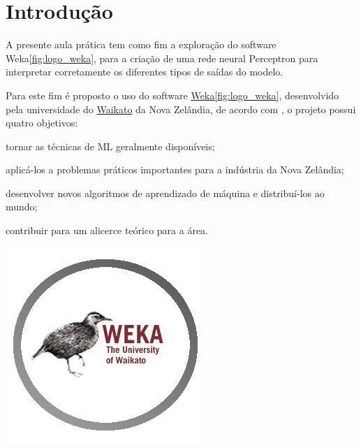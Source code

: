 
\section{Introdução}

\noindent \begin{minipage}[c]{0.6\textwidth}
  \vspace {1cm}
  \par A presente aula prática tem como fim a exploração do software Weka\ref{fig:logo_weka}, para a criação de uma rede neural Perceptron para interpretar corretamente os diferentes tipos de saídas do modelo.
  \par Para este fim é proposto o uso do software \href{https://www.cs.waikato.ac.nz/ml/index.html}{Weka}\ref{fig:logo_weka}, desenvolvido pela universidade do \href{https://www.waikato.ac.nz/}{Waikato} da Nova Zelândia, de acordo com , o projeto possui quatro objetivos:
  \begin{asparaenum}
    \item tornar as técnicas de ML geralmente disponíveis;
    \item aplicá-los a problemas práticos importantes para a indústria da Nova Zelândia;
    \item desenvolver novos algoritmos de aprendizado de máquina e distribuí-los ao mundo;
    \item contribuir para um alicerce teórico para a área.
  \end{asparaenum}

\end{minipage}
\begin{minipage}[c]{0.4\textwidth}

  \includegraphics[width=\textwidth]{figure/weka-logo.jpg}
  	\label{fig:logo_weka}
\end{minipage}



